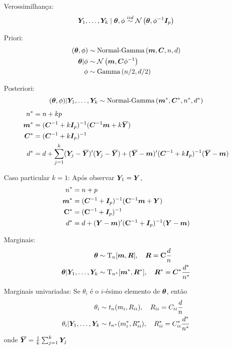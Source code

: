 \begin{theorem}
	\leavevmode 
	\begin{outline}
		\1 Verossimilhança: 
		\[ \v{Y}_1, \ldots, \v{Y}_k \mid \v{\theta}, \phi \stackrel{iid}{\sim} \normdist{\v{\theta}, \phi^{-1}\v{I}_p}\]
		
		\1 Priori:
		\begin{align}
			(\v{\theta},\phi) &\sim \ngdist{\v{m}, \v{C}, n, d} \\
			\v{\theta}|\phi &\sim \normdist{\v{m}, \v{C}\phi^{-1}} \\
			\phi &\sim \gammadist{n/2, d/2}
		\end{align}
		
		\1 Posteriori: 
		\[ (\bm{\theta},\phi)|\bm{Y}_1, \ldots, \bm{Y}_k \sim \operatorname{Normal-Gamma}\left(\bm{m}^*, \bm{C}^*, n^*, d^*\right)\]
		\begin{align}
			n^* &= n+kp \\
			\bm{m}^* &= (\bm{C}^{-1} + k\bm{I}_p)^{-1}(\bm{C}^{-1}\bm{m} + k\,\overline{\!{\bm{Y}}}) \\
			\bm{C}^* &= (\bm{C}^{-1} + k\bm{I}_p)^{-1} \\
			d^* &= d + \sum_{j=1}^k (\bm{Y}_j - \,\overline{\!{\bm{Y}}})'(\bm{Y}_j - \,\overline{\!{\bm{Y}}}) + (\,\overline{\!{\bm{Y}}} - \bm{m})'(\bm{C}^{-1} + k\bm{I}_p)^{-1}(\,\overline{\!{\bm{Y}}} - \bm{m})
		\end{align}	
		
		\2 Caso particular $k=1$: Após observar $\bm{Y}_1 = \bm{Y}$,
		\begin{align}
			n^* &= n+p \\
			\bm{m}^* &= (\bm{C}^{-1} + \bm{I}_p)^{-1}(\mathbf{C}^{-1}\bm{m} + \bm{Y}) \\
			\mathbf{C}^* &= (\mathbf{C}^{-1} + \bm{I}_p)^{-1} \\
			d^* &= d + (\bm{Y} - \bm{m})'(\mathbf{C}^{-1} + \bm{I}_p)^{-1}(\bm{Y} - \bm{m})
		\end{align}
		
		\1 Marginais:
		\begin{align}
			\bm{\theta} &\sim \text{T}_n[\bm{m}, \bm{R}], \quad \bm{R}=\mathbf{C}\frac{d}{n} \\
			\bm{\theta}|\bm{Y}_1, \ldots, \bm{Y}_k &\sim \text{T}_{n^*}[\bm{m}^*, \bm{R}^*], \quad \bm{R}^*=\bm{C}^*\frac{d^*}{n^*}
		\end{align}
		
		\1 Marginais univariadas: Se $\theta_i$ é o $i$-ésimo elemento de $\bm{\theta}$, então
		\begin{align}
			\theta_i &\sim t_{n}(m_i, R_{ii}), \quad R_{ii}=C_{ii}\frac{d}{n} \\
			\theta_i|\bm{Y}_1, \ldots, \bm{Y}_k &\sim t_{n^*}(m_i^*, R_{ii}^*), \quad R_{ii}^*=C_{ii}^*\frac{d^*}{n^*}
		\end{align}
		onde $\,\overline{\!{\bm{Y}}} = \frac{1}{k}\sum_{j=1}^k \bm{Y}_j$
	\end{outline}
	

\end{theorem}
